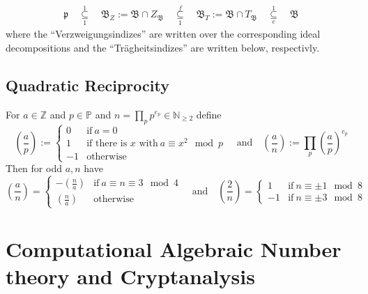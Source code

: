 \documentclass{scrartcl}
\newcommand{\N}{\mathbb{N}}
\newcommand{\Z}{\mathbb{Z}}
\begin{document}
\begin{align*}
    \mathfrak{p} \quad \underset{1}{\overset{1}{\subseteq}} \quad \mathfrak{B}_Z := \mathfrak{B} \cap Z_\mathfrak{B} \quad \underset{1}{\overset{f}{\subseteq}} \quad \mathfrak{B}_T := \mathfrak{B} \cap T_\mathfrak{B} \quad \underset{e}{\overset{1}{\subseteq}} \quad \mathfrak{B}
\end{align*}
where the ``Verzweigungsindizes'' are written over the corresponding ideal decompositions and the ``Trägheitsindizes'' are written below, respectivly.

\subsection{Quadratic Reciprocity}
For $a \in \Z$ and $p \in \mathbb{P}$ and $n = \prod_{p} p^{e_p} \in \N_{\geq 2}$ define
\begin{equation*}
    \left(\frac a p \right) := \begin{cases}
        0 & \text{if} \ a = 0 \\
        1 & \text{if there is $x$ with} \ a \equiv x^2 \mod p \\
        -1 & \text{otherwise}
    \end{cases} \quad \text{and} \quad
    \left(\frac a n \right) := \prod_p \left( \frac a p \right)^{e_p}
\end{equation*}
Then for odd $a, n$ have
\begin{equation*}
    \left(\frac a n\right) = \begin{cases}
        -\left(\frac n a \right) & \text{if} \ a \equiv n \equiv 3 \mod 4 \\
        \left(\frac n a \right) & \text{otherwise}
    \end{cases} \quad \text{and} \quad
    \left(\frac 2 n\right) = \begin{cases}
        1 & \text{if} \ n \equiv \pm 1 \mod 8 \\
        -1 & \text{if} \ n \equiv \pm 3 \mod 8
    \end{cases}
\end{equation*}

\section{Computational Algebraic Number theory and Cryptanalysis}
\end{document}
